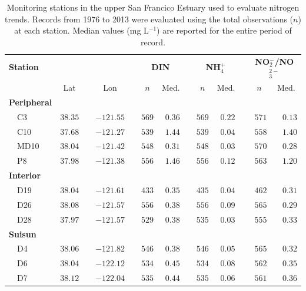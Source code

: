 \documentclass[letterpaper,12pt,oneside]{article}\usepackage[]{graphicx}\usepackage[]{color}
\begin{document}
\begin{table}[!tbp]
\caption{Monitoring stations in the upper San Francico Estuary used to evaluate nitrogen trends. Records from 1976 to 2013 were evaluated using the total observations ($n$) at each station. Median values (mg L$^{-1}$) are reported for the entire period of record.\label{tab:stdescrp}} 
\begin{center}
\begin{tabular}{lrcrcrrcrrcrr}
\hline\hline
\multicolumn{1}{l}{\bfseries Station}&\multicolumn{1}{c}{\bfseries }&\multicolumn{1}{c}{\bfseries }&\multicolumn{1}{c}{\bfseries }&\multicolumn{1}{c}{\bfseries }&\multicolumn{2}{c}{\bfseries DIN}&\multicolumn{1}{c}{\bfseries }&\multicolumn{2}{c}{\bfseries NH$_{4}^{+}$}&\multicolumn{1}{c}{\bfseries }&\multicolumn{2}{c}{\bfseries NO$_{2}^{-}$/NO$_{3}^{2-}$}\tabularnewline
\cline{6-7} \cline{9-10} \cline{12-13}
\multicolumn{1}{l}{}&\multicolumn{1}{c}{Lat}&\multicolumn{1}{c}{}&\multicolumn{1}{c}{Lon}&\multicolumn{1}{c}{}&\multicolumn{1}{c}{$n$}&\multicolumn{1}{c}{Med.}&\multicolumn{1}{c}{}&\multicolumn{1}{c}{$n$}&\multicolumn{1}{c}{Med.}&\multicolumn{1}{c}{}&\multicolumn{1}{c}{$n$}&\multicolumn{1}{c}{Med.}\tabularnewline
\hline
{\bfseries Peripheral}&&&&&&&&&&&&\tabularnewline
~~C3&$38.35$&&$-121.55$&&$569$&$0.36$&&$569$&$0.22$&&$571$&$0.13$\tabularnewline
~~C10&$37.68$&&$-121.27$&&$539$&$1.44$&&$539$&$0.04$&&$558$&$1.40$\tabularnewline
~~MD10&$38.04$&&$-121.42$&&$548$&$0.31$&&$548$&$0.03$&&$570$&$0.28$\tabularnewline
~~P8&$37.98$&&$-121.38$&&$556$&$1.46$&&$556$&$0.12$&&$563$&$1.20$\tabularnewline
\hline
{\bfseries Interior}&&&&&&&&&&&&\tabularnewline
~~D19&$38.04$&&$-121.61$&&$433$&$0.35$&&$435$&$0.04$&&$462$&$0.31$\tabularnewline
~~D26&$38.08$&&$-121.57$&&$556$&$0.38$&&$556$&$0.09$&&$565$&$0.29$\tabularnewline
~~D28&$37.97$&&$-121.57$&&$529$&$0.38$&&$535$&$0.03$&&$555$&$0.33$\tabularnewline
\hline
{\bfseries Suisun}&&&&&&&&&&&&\tabularnewline
~~D4&$38.06$&&$-121.82$&&$546$&$0.38$&&$546$&$0.05$&&$565$&$0.32$\tabularnewline
~~D6&$38.04$&&$-122.12$&&$534$&$0.45$&&$534$&$0.08$&&$562$&$0.35$\tabularnewline
~~D7&$38.12$&&$-122.04$&&$535$&$0.44$&&$535$&$0.06$&&$561$&$0.36$\tabularnewline
\hline
\end{tabular}\end{center}
\end{table}
\end{document}
